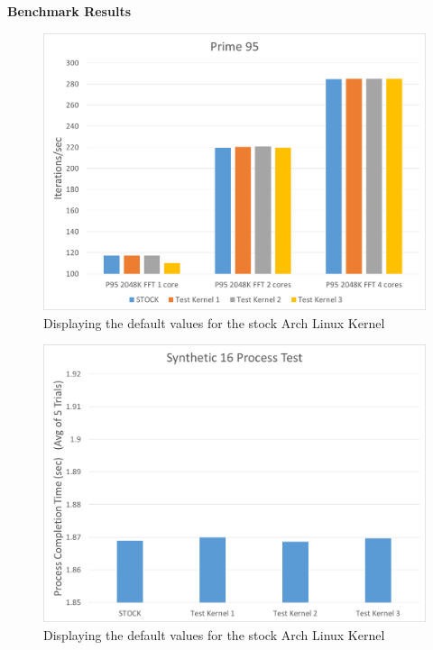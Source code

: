 \textbf{Benchmark Results}

\begin{figure}[hb]
	\includegraphics[width=1.0\columnwidth]{images/P95}
	\caption{Displaying the default values for the stock Arch Linux Kernel}
\end{figure}

\begin{figure}[hb]
	\includegraphics[width=1.0\columnwidth]{images/Synthetic}
	\caption{Displaying the default values for the stock Arch Linux Kernel}
\end{figure}

